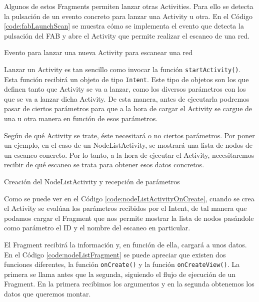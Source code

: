 Algunos de estos Fragments permiten lanzar otras Activities. Para ello se detecta la pulsación de un evento concreto para lanzar una Activity u otra. En el Código \ref{code:fabLaunchScan} se muestra cómo se implementa el evento que detecta la pulsación del FAB y abre el Activity  que permite realizar el escaneo de una red.

\begin{code}
	\caption{Evento para lanzar una nueva Activity para escanear una red}
	\label{code:fabLaunchScan}
	
\end{code}

Lanzar un Activity es tan sencillo como invocar la función \texttt{startActivity()}. Esta función recibirá un objeto de tipo \texttt{Intent}. Este tipo de objetos son los que definen tanto que Activity se va a lanzar, como los diversos parámetros con los que se va a lanzar dicha Activity. De esta manera, antes de ejecutarla podremos pasar de ciertos parámetros para que a la hora de cargar el Activity se cargue de una u otra manera en función de esos parámetros.

Según de qué Activity se trate, éste necesitará o no ciertos parámetros. Por poner un ejemplo, en el caso de un NodeListActivity, se mostrará una lista de nodos de un escaneo concreto. Por lo tanto, a la hora de ejecutar el Activity, necesitaremos recibir de qué escaneo se trata para obtener esos datos concretos.

\begin{code}
	\caption{Creación del NodeListActivity y recepción de parámetros}
	\label{code:nodeListActivityOnCreate}
	
\end{code}

Como se puede ver en el Código \ref{code:nodeListActivityOnCreate}, cuando se crea el Activity se evalúan los parámetros recibidos por el Intent, de tal manera que podamos cargar el Fragment que nos permite mostrar la lista de nodos pasándole como parámetro el ID y el nombre del escaneo en particular.

El Fragment recibirá la información y, en función de ella, cargará a unos datos. En el Código \ref{code:nodeListFragment} se puede apreciar que existen dos funciones diferentes, la función \texttt{onCreate()} y la función \texttt{onCreateView()}. La primera se llama antes que la segunda, siguiendo el flujo de ejecución de un Fragment. En la primera recibimos los argumentos y en la segunda obtenemos los datos que queremos montar.

